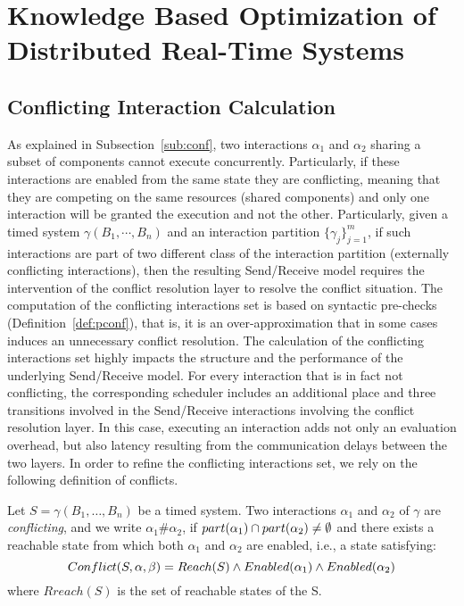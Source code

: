 \chapter{Knowledge Based Optimization of Distributed Real-Time Systems}\label{chap:4}
\minitoc

\section{Conflicting Interaction Calculation}

As explained in Subsection~\ref{sub:conf}, two interactions $\alpha_1$ and $\alpha_2$ 
sharing a subset of components cannot execute concurrently.
Particularly, if these interactions are enabled from the same state they are conflicting, meaning
that they are competing on the same resources (shared components) and only one interaction will
be granted the execution and not the other.
Particularly, given a timed system $\gamma(B_1,\cdots,B_n)$ and an interaction partition
$\{\gamma_j\}_{j=1}^m$, if such interactions are part of two different class of the interaction
partition (externally conflicting interactions), then the resulting Send/Receive model requires 
the intervention of the conflict resolution layer to resolve the conflict situation. 
The computation of the conflicting interactions set is based on syntactic pre-checks
(Definition~\ref{def:pconf}), that is, it is an over-approximation that in some cases  
induces an unnecessary conflict resolution.  
The calculation of the conflicting interactions set highly impacts the structure and the 
performance of the underlying Send/Receive model. For every interaction that is in fact
not conflicting, the corresponding scheduler includes an additional place and three transitions
involved in the Send/Receive interactions involving the conflict resolution layer.
In this case, executing an interaction adds not only an evaluation overhead, but also latency 
resulting from the communication delays between the two layers.
In order to refine the conflicting interactions set, we rely on the following definition
of conflicts.
\begin{definition}
\label{def:conf}
Let $S = \gamma(B_1,\dotsc,B_n)$ be a timed system. Two interactions 
$\alpha_1$ and $\alpha_2$ of $\gamma$ are \emph{conflicting}, and we write $\alpha_1\#\alpha_2$, 
  if $part(\alpha_1) \cap part(\alpha_2) \neq \emptyset$ and there exists a reachable state from 
which both $\alpha_1$ and $\alpha_2$ are enabled, i.e., a state satisfying:
\begin{equation}\label{eq:conf1}
  Conflict(S,\alpha,\beta)=Reach(S) \wedge Enabled(\alpha_1) \wedge Enabled(\alpha_2)
\end{equation}
  where $Rreach(S)$ is the set of reachable states of the S.
\end{definition}


